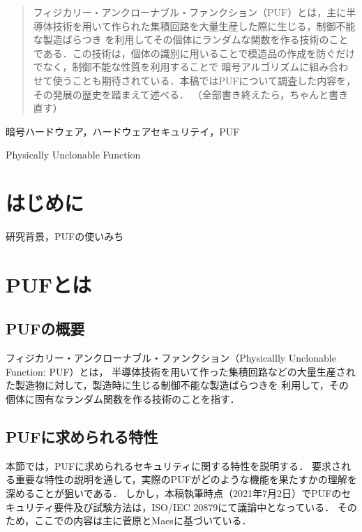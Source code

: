 \documentclass[technicalreport]{ieicej} %
\begin{document}
\begin{abstract}
  フィジカリー・アンクローナブル・ファンクション（PUF）とは，主に半導体技術を用いて作られた集積回路を大量生産した際に生じる，制御不能な製造ばらつき
  を利用してその個体にランダムな関数を作る技術のことである．この技術は，個体の識別に用いることで模造品の作成を防ぐだけでなく，制御不能な性質を利用することで
  暗号アルゴリズムに組み合わせて使うことも期待されている．本稿ではPUFについて調査した内容を，その発展の歴史を踏まえて述べる．
  （全部書き終えたら，ちゃんと書き直す）
\end{abstract}
\begin{keyword}
  暗号ハードウェア，ハードウェアセキュリテイ，PUF
\end{keyword}
\begin{eabstract}
\end{eabstract}
\begin{ekeyword}
  Physically Unclonable Function
\end{ekeyword}
\maketitle

\section{はじめに}
研究背景，PUFの使いみち

\section{PUFとは}
\subsection{PUFの概要}
フィジカリー・アンクローナブル・ファンクション（Physicallly Unclonable Function: PUF）とは，
半導体技術を用いて作った集積回路などの大量生産された製造物に対して，製造時に生じる制御不能な製造ばらつきを
利用して，その個体に固有なランダム関数を作る技術のことを指す．
\subsection{PUFに求められる特性}
本節では，PUFに求められるセキュリティに関する特性を説明する．
要求される重要な特性の説明を通して，実際のPUFがどのような機能を果たすかの理解を深めることが狙いである．
しかし，本稿執筆時点（2021年7月2日）でPUFのセキュリティ要件及び試験方法は，ISO/IEC 20879にて議論中となっている．
そのため，ここでの内容は主に菅原\cite{sugatake}とMaes\cite{maes1}に基づいている．
\end{document}
